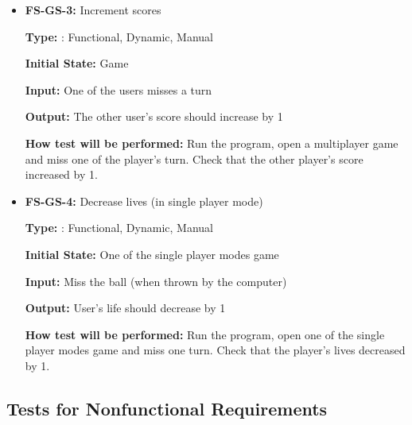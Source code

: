 \documentclass[12pt,letterpaper]{article}
\begin{document}
\begin{reqbox}
	\begin{itemize}
	\item \textbf{FS-GS-3: }Increment scores

	\textbf{Type: }: Functional, Dynamic, Manual

	\textbf{Initial State: } Game 

	\textbf{Input: } One of the users misses a turn

	\textbf{Output: }The other user’s score should increase by 1

	\textbf{How test will be performed: }Run the program, open a multiplayer game and miss one of the player’s turn. Check that the other player’s score increased by 1.
	\end{itemize}
\end{reqbox}

\begin{reqbox}
	\begin{itemize}
	\item \textbf{FS-GS-4: }Decrease lives (in single player mode)

	\textbf{Type: }: Functional, Dynamic, Manual

	\textbf{Initial State: } One of the single player modes game 

	\textbf{Input: } Miss the ball (when thrown by the computer)

	\textbf{Output: }User’s life should decrease by 1

	\textbf{How test will be performed: }Run the program, open one of the single player modes game and miss one turn. Check that the player’s lives decreased by 1.
	\end{itemize}
\end{reqbox}

	\subsection{Tests for Nonfunctional Requirements}
\end{document}
